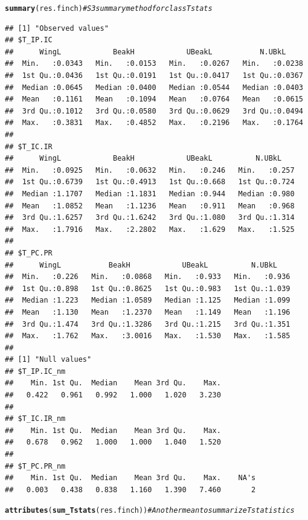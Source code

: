 \documentclass[12pt]{article}\usepackage[]{graphicx}\usepackage[]{color}
\makeatletter
\newcommand{\hlcom}[1]{\textcolor[rgb]{0.678,0.584,0.686}{\textit{#1}}}%
\newcommand{\hlstd}[1]{\textcolor[rgb]{0.345,0.345,0.345}{#1}}%
\newcommand{\hlkwd}[1]{\textcolor[rgb]{0.737,0.353,0.396}{\textbf{#1}}}%
\newenvironment{kframe}{%
 \def\at@end@of@kframe{}%
 \ifinner\ifhmode%
  \def\at@end@of@kframe{\end{minipage}}%
  \begin{minipage}{\columnwidth}%
 \fi\fi%
 \def\FrameCommand##1{\hskip\@totalleftmargin \hskip-\fboxsep
 \colorbox{shadecolor}{##1}\hskip-\fboxsep
     \hskip-\linewidth \hskip-\@totalleftmargin \hskip\columnwidth}%
 \MakeFramed {\advance\hsize-\width
   \@totalleftmargin\z@ \linewidth\hsize
   \@setminipage}}%
 {\par\unskip\endMakeFramed%
 \at@end@of@kframe}
\newenvironment{knitrout}{}{} %
\makeatother
\begin{document}
\begin{knitrout}
\color{fgcolor}\begin{kframe}
\begin{alltt}
\hlkwd{summary}\hlstd{(res.finch)} \hlcom{#S3 summary method for class Tstats}
\end{alltt}
\begin{verbatim}
## [1] "Observed values"
## $T_IP.IC
##      WingL            BeakH            UBeakL           N.UBkL      
##  Min.   :0.0343   Min.   :0.0153   Min.   :0.0267   Min.   :0.0238  
##  1st Qu.:0.0436   1st Qu.:0.0191   1st Qu.:0.0417   1st Qu.:0.0367  
##  Median :0.0645   Median :0.0400   Median :0.0544   Median :0.0403  
##  Mean   :0.1161   Mean   :0.1094   Mean   :0.0764   Mean   :0.0615  
##  3rd Qu.:0.1012   3rd Qu.:0.0580   3rd Qu.:0.0629   3rd Qu.:0.0494  
##  Max.   :0.3831   Max.   :0.4852   Max.   :0.2196   Max.   :0.1764  
## 
## $T_IC.IR
##      WingL            BeakH            UBeakL          N.UBkL     
##  Min.   :0.0925   Min.   :0.0632   Min.   :0.246   Min.   :0.257  
##  1st Qu.:0.6739   1st Qu.:0.4913   1st Qu.:0.668   1st Qu.:0.724  
##  Median :1.1707   Median :1.1831   Median :0.944   Median :0.980  
##  Mean   :1.0852   Mean   :1.1236   Mean   :0.911   Mean   :0.968  
##  3rd Qu.:1.6257   3rd Qu.:1.6242   3rd Qu.:1.080   3rd Qu.:1.314  
##  Max.   :1.7916   Max.   :2.2802   Max.   :1.629   Max.   :1.525  
## 
## $T_PC.PR
##      WingL           BeakH            UBeakL          N.UBkL     
##  Min.   :0.226   Min.   :0.0868   Min.   :0.933   Min.   :0.936  
##  1st Qu.:0.898   1st Qu.:0.8625   1st Qu.:0.983   1st Qu.:1.039  
##  Median :1.223   Median :1.0589   Median :1.125   Median :1.099  
##  Mean   :1.130   Mean   :1.2370   Mean   :1.149   Mean   :1.196  
##  3rd Qu.:1.474   3rd Qu.:1.3286   3rd Qu.:1.215   3rd Qu.:1.351  
##  Max.   :1.762   Max.   :3.0016   Max.   :1.530   Max.   :1.585  
## 
## [1] "Null values"
## $T_IP.IC_nm
##    Min. 1st Qu.  Median    Mean 3rd Qu.    Max. 
##   0.422   0.961   0.992   1.000   1.020   3.230 
## 
## $T_IC.IR_nm
##    Min. 1st Qu.  Median    Mean 3rd Qu.    Max. 
##   0.678   0.962   1.000   1.000   1.040   1.520 
## 
## $T_PC.PR_nm
##    Min. 1st Qu.  Median    Mean 3rd Qu.    Max.    NA's 
##   0.003   0.438   0.838   1.160   1.390   7.460       2
\end{verbatim}
\begin{alltt}
\hlkwd{attributes}\hlstd{(}\hlkwd{sum_Tstats}\hlstd{(res.finch))} \hlcom{#An other mean to summarize Tstatistics}
\end{alltt}

\end{kframe}
\end{knitrout}
\end{document}
